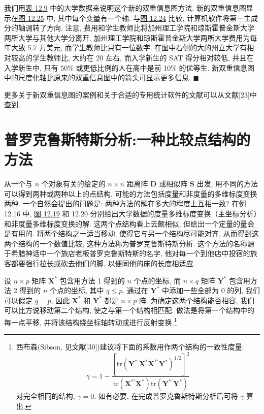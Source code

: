 
我们用\hyperref[tab:12.9]{表 12.9} 中的大学数据来说明这个新的双重信息图方法. 新的双重信息图显示在\hyperref[fig:12.25]{图 12.25} 中, 其中每个变量有一个轴. 与\hyperref[fig:12.24]{图 12.24} 比较, 计算机软件将第一主成分的轴调转了方向. 注意, 费用和学生教师比将加州理工学院和琼斯霍普金斯大学两所大学与其他大学分离开. 加州理工学院和琼斯霍普金斯大学两所大学费用为每年大致 5.7 万美元, 而学生教师比只有一位数字. 在图中右侧的大的州立大学有相对较高的学生教师比, 大约在 20 左右, 而入学新生的 SAT 得分相对较低, 并且在入学新生中, 只有 50\% 或更低比例的人在高中是前 10\% 的优等生. 新双重信息图中的尺度化轴比原来的双重信息图中的箭头可显示更多信息. \hfill$\blacksquare$

更多关于新双重信息图的案例和关于合适的专用统计软件的文献可以从文献[23]中查到.

\section{普罗克鲁斯特斯分析:一种比较点结构的方法}
\label{sec:12.9}

从一个与 $n$ 个对象有关的给定的 $n\times n$ 距离阵 $\mathbf{D}$ 或相似阵 $\mathbf{S}$ 出发, 用不同的方法可以得到两种或两种以上的点结构. 可能的方法包括度量和非度量的多维标度变换两种. 一个自然会提出的问题是: 两种方法的解在多大的程度上互相一致? 在例 12.16 中, \hyperref[fig:12.19]{图 12.19} 和 12.20 分别给出大学数据的度量多维标度变换（主坐标分析）和非度量多维标度变换的解. 这两个点结构看上去颇相似, 但给出一个定量的量会是有用的. 将两个结构之一适当移动, 使得它与另一个结构尽可能对齐, 从而得到这两个结构的一个数值比较, 这种方法称为普罗克鲁斯特斯分析. 这个方法的名称源于希腊神话中一个旅店老板普罗克鲁斯特斯的名字, 他对每一个到他店中投宿的旅客都要强行拉长或砍去他们的脚, 以便同他的床的长度相适应.


设 $n\times p$ 矩阵 $\mathbf{X}^{*}$ 包含用方法 1 得到的 $n$ 个点的坐标, 而 $n\times q$ 矩阵 $\mathbf{Y}^{*}$ 包含用方法 2 得到的 $n$ 个点的坐标, 其中 $q\leqslant p$. 通过在 $\mathbf{Y}^{*}$ 中添加一些全部为 0 的列, 我们可以假定 $q=p$, 因此 $\mathbf{X}^{*}$ 和 $\mathbf{Y}^{*}$ 都是 $n\times p$ 阵. 为确定这两个结构能否相容, 我们可以比方说移动第二个结构, 使之与第一个结构相匹配. 做法是将第一个结构中的每一点平移, 并将该结构绕坐标轴转动或进行反射变换.\footnote{西布森(Sibson, 见文献[30])建议将下面的系数用作两个结构的一致性度量:
\[
\gamma=1-\frac{[\mathrm{tr}(\mathbf{Y}^{*\prime}\mathbf{X}^{*}\mathbf{X}^{*\prime}\mathbf{Y}^{*})^{1/2}]^{2}}{\mathrm{tr}(\mathbf{X}^{*\prime}\mathbf{X}^{*})\mathrm{tr}(\mathbf{Y}^{*\prime}\mathbf{Y}^{*})}
\]
对完全相同的结构, $\gamma=0$. 如有必要, 在完成普罗克鲁斯特斯分析后可将 $\gamma$ 算出.}

